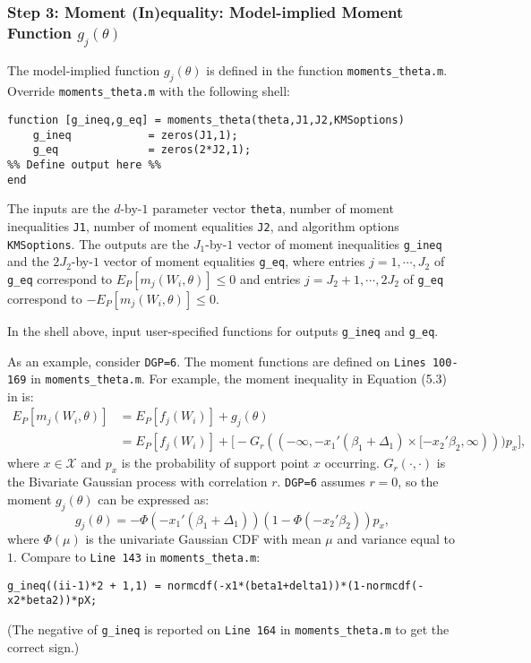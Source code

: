 \documentclass[12pt]{article}
\def\code#1{\texttt{#1}}
\begin{document}
\subsubsection*{Step 3: Moment (In)equality: Model-implied Moment Function $g_j(\theta)$}
The model-implied function $g_j(\theta)$ is defined in the function \code{moments\_theta.m}.  Override  \code{moments\_theta.m} with the following shell:
\footnotesize
\begin{lstlisting}[backgroundcolor = \color{gray!30},
                   xleftmargin = 0cm,
                   framexleftmargin = 1em]
function [g_ineq,g_eq] = moments_theta(theta,J1,J2,KMSoptions)
    g_ineq            = zeros(J1,1);
    g_eq              = zeros(2*J2,1);
%% Define output here %%
end
\end{lstlisting} \normalsize
The inputs are the $d$-by-$1$ parameter vector \code{theta}, number of moment inequalities \code{J1}, number of moment equalities \code{J2}, and algorithm options \code{KMSoptions}.  The outputs are the $J_1$-by-$1$ vector of moment inequalities \code{g\_ineq} and the $2J_2$-by-$1$ vector of moment equalities \code{g\_eq}, where entries $j=1,\cdots,J_2$ of \code{g\_eq} correspond to $E_P[m_j(W_i,\theta)] \leq 0$ and entries $j = J_2+1,\cdots,2J_2$ of \code{g\_eq} correspond to $-E_P[m_j(W_i,\theta)] \leq 0$.

In the shell above, input user-specified functions for outputs \code{g\_ineq} and \code{g\_eq}.


As an example, consider \code{DGP=6}.  The moment functions are defined on \code{Lines 100-169} in  \code{moments\_theta.m}.  For example, the moment inequality in Equation (5.3) in  is:
    \footnotesize
    \begin{align*}
    E_P[m_{j}(W_i,\theta)] & = E_P[f_{j}(W_i)]  + g_{j}(\theta) \\
     & = E_P[f_{j}(W_i)]   +\bigg[ - G_r((-\infty,-x_1'(\beta_1 + \Delta_1) \times [-x_2'\beta_2,\infty)))p_x\bigg],
    \end{align*}\normalsize
where $x \in \mathcal{X}$ and $p_x$ is the probability of support point $x$ occurring. $G_r(\cdot,\cdot)$ is the Bivariate Gaussian process with correlation $r$.  \code{DGP=6} assumes $r=0$, so the moment $g_{j}(\theta)$ can be expressed as:
\[
g_{j}(\theta) =  -\Phi(-x_1'(\beta_1 + \Delta_1))(1- \Phi(-x_2'\beta_2))p_x,
\]
where $\Phi(\mu)$ is the univariate Gaussian CDF with mean $\mu$ and variance equal to $1$.  Compare to \code{Line 143} in \code{moments\_theta.m}:
\footnotesize
    \begin{lstlisting}[backgroundcolor = \color{gray!30},
                   xleftmargin = 0cm,
                   framexleftmargin = 1em]
g_ineq((ii-1)*2 + 1,1) = normcdf(-x1*(beta1+delta1))*(1-normcdf(-x2*beta2))*pX;
    \end{lstlisting}\normalsize
(The negative of \code{g\_ineq} is reported on \code{Line 164} in \code{moments\_theta.m} to get the correct sign.)
\end{document}
